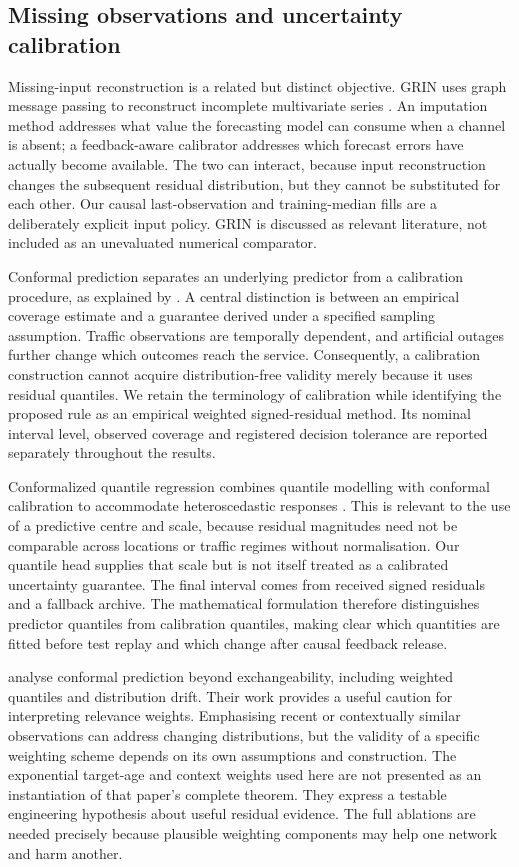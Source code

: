 \subsection{Missing observations and uncertainty calibration}
Missing-input reconstruction is a related but distinct objective. GRIN uses graph message passing to reconstruct incomplete multivariate series \citep{cini2022}. An imputation method addresses what value the forecasting model can consume when a channel is absent; a feedback-aware calibrator addresses which forecast errors have actually become available. The two can interact, because input reconstruction changes the subsequent residual distribution, but they cannot be substituted for each other. Our causal last-observation and training-median fills are a deliberately explicit input policy. GRIN is discussed as relevant literature, not included as an unevaluated numerical comparator.

Conformal prediction separates an underlying predictor from a calibration procedure, as explained by \citet{angelopoulos2021}. A central distinction is between an empirical coverage estimate and a guarantee derived under a specified sampling assumption. Traffic observations are temporally dependent, and artificial outages further change which outcomes reach the service. Consequently, a calibration construction cannot acquire distribution-free validity merely because it uses residual quantiles. We retain the terminology of calibration while identifying the proposed rule as an empirical weighted signed-residual method. Its nominal interval level, observed coverage and registered decision tolerance are reported separately throughout the results.

Conformalized quantile regression combines quantile modelling with conformal calibration to accommodate heteroscedastic responses \citep{romano2019}. This is relevant to the use of a predictive centre and scale, because residual magnitudes need not be comparable across locations or traffic regimes without normalisation. Our quantile head supplies that scale but is not itself treated as a calibrated uncertainty guarantee. The final interval comes from received signed residuals and a fallback archive. The mathematical formulation therefore distinguishes predictor quantiles from calibration quantiles, making clear which quantities are fitted before test replay and which change after causal feedback release.

\citet{barber2023} analyse conformal prediction beyond exchangeability, including weighted quantiles and distribution drift. Their work provides a useful caution for interpreting relevance weights. Emphasising recent or contextually similar observations can address changing distributions, but the validity of a specific weighting scheme depends on its own assumptions and construction. The exponential target-age and context weights used here are not presented as an instantiation of that paper's complete theorem. They express a testable engineering hypothesis about useful residual evidence. The full ablations are needed precisely because plausible weighting components may help one network and harm another.

